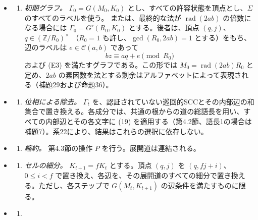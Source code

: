 \documentclass[11pt,reqno]{amsart}
\theoremstyle{definition}
\theoremstyle{definition}
\theoremstyle{remark}
\providecommand{\tightlist}{\setlength{\itemsep}{0pt}\setlength{\parskip}{0pt}}
\begin{document}
\begin{itemize}
\tightlist
\item
  \begin{enumerate}
  \def\labelenumi{(\Roman{enumi})}
  \tightlist
  \item
    \emph{初期グラフ。} \(\Gamma_0=G(M_0,K_0)\) とし、すべての許容状態を頂点とし、\(\Sigma\) のすべてのラベルを使う。
    または、最終的な法が \(\operatorname{rad}(2ab)\) の倍数になる場合には \(\Gamma_0=G'(R_0,K_0)\) とする。後者は、頂点 \((q,j)\)、\(q\in(\mathbb Z/R_0)^\times\)
    （\(R_0=1\) も許し、\(\gcd(R_0,2ab)=1\) とする）をもち、辺のラベルは \(e\in\mathcal C(a,b)\) であって
    \[
    bz\equiv aq+e\pmod{R_0}
    \]
    および (E3) を満たすグラフである。この形では \(M_0=\operatorname{rad}(2ab)R_0\) と定め、\(2ab\) の素因数を法とする剰余はアルファベットによって表現される（補題29および命題36）。
  \end{enumerate}
\item
  \begin{enumerate}
  \def\labelenumi{(\Alph{enumi})}
  \setcounter{enumi}{15}
  \tightlist
  \item
    \emph{位相による除去。} \(\Gamma_t\) を、認証されていない巡回的SCCとその内部辺の和集合で置き換える。各成分では、共通の根からの道の総語長を用い、すべての内部辺とその各文字に (19) を適用する（第4.2節、語長1の場合は補題7）。系22により、結果はこれらの選択に依存しない。
  \end{enumerate}
\item
  \begin{enumerate}
  \def\labelenumi{(\Alph{enumi})}
  \setcounter{enumi}{2}
  \tightlist
  \item
    \emph{縮約。} 第4.3節の操作 \(P\) を行う。展開道は連結される。
  \end{enumerate}
\item
  \begin{enumerate}
  \def\labelenumi{(\Alph{enumi})}
  \setcounter{enumi}{17}
  \tightlist
  \item
    \emph{セルの細分。} \(K_{t+1}=fK_t\) とする。頂点 \((q,j)\) を \((q,fj+i)\)、\(0\le i<f\) で置き換え、各辺を、その展開道のすべての細分で置き換える。ただし、各ステップで \(G(M_t,K_{t+1})\) の辺条件を満たすものに限る。
  \end{enumerate}
\item
  \begin{enumerate}
  \def\labelenumi{(\Alph{enumi})}
  \setcounter{enumi}{11}
  \tightlist
  \item

\end{enumerate}
\end{itemize}
\end{document}
